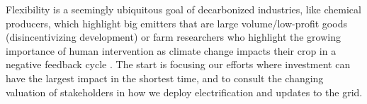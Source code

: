 Flexibility is a seemingly ubiquitous goal of decarbonized industries, like chemical producers, which highlight big emitters that are large volume/low-profit goods (disincentivizing development) \cite{mallapragada_decarbonization_2023} or farm researchers who highlight the growing importance of human intervention as climate change impacts their crop in a negative feedback cycle \cite{farokhi_soofi_farm_2022}. The start is focusing our efforts where investment can have the largest impact in the shortest time, and to consult the changing valuation of stakeholders in how we deploy electrification and updates to the grid.